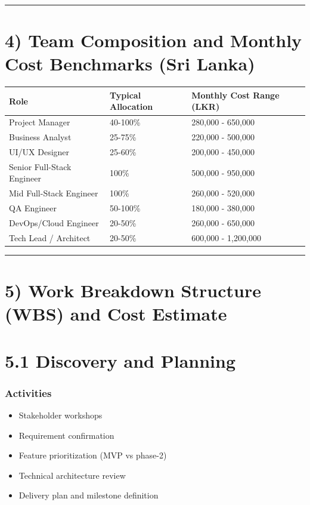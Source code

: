 \documentclass[11pt,a4paper]{article}
\begin{document}
\bigskip\hrule\bigskip

\section{4) Team Composition and Monthly Cost Benchmarks (Sri Lanka)}

\begin{longtable}{p{} | p{} | p{}}
\toprule
Role & Typical Allocation & Monthly Cost Range (LKR) \\
\midrule
Project Manager & 40-100\% & 280,000 - 650,000 \\
Business Analyst & 25-75\% & 220,000 - 500,000 \\
UI/UX Designer & 25-60\% & 200,000 - 450,000 \\
Senior Full-Stack Engineer & 100\% & 500,000 - 950,000 \\
Mid Full-Stack Engineer & 100\% & 260,000 - 520,000 \\
QA Engineer & 50-100\% & 180,000 - 380,000 \\
DevOps/Cloud Engineer & 20-50\% & 260,000 - 650,000 \\
Tech Lead / Architect & 20-50\% & 600,000 - 1,200,000 \\
\bottomrule
\end{longtable}

\bigskip\hrule\bigskip

\section{5) Work Breakdown Structure (WBS) and Cost Estimate}

\section{5.1 Discovery and Planning}

\subsubsection{Activities}

\begin{itemize}
\item Stakeholder workshops
\item Requirement confirmation
\item Feature prioritization (MVP vs phase-2)
\item Technical architecture review
\item Delivery plan and milestone definition
\end{itemize}
\end{document}

